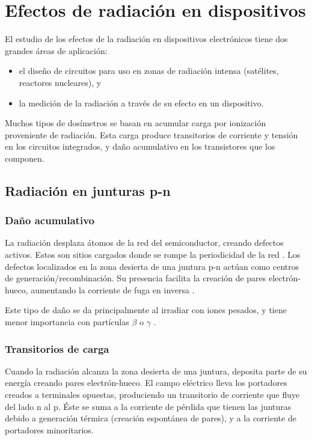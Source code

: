\section{Efectos de radiación en dispositivos}
El estudio de los efectos de la radiación en dispositivos electrónicos 
tiene dos grandes áreas de aplicación:
\begin{itemize}
    \item el diseño de circuitos para uso en zonas de radiación intensa
        (satélites, reactores nucleares), y
    \item la medición de la radiación a través de su efecto en un dispositivo.
\end{itemize}
Muchos tipos de dosímetros se basan en acumular 
carga por ionización proveniente de radiación.
Esta carga produce transitorios de corriente y tensión en los circuitos 
integrados, y daño acumulativo en los transistores que los componen.

\subsection{Radiación en junturas p-n}
\subsubsection{Daño acumulativo}
La radiación desplaza átomos de la red del semiconductor, 
creando defectos activos.
Estos son sitios cargados donde se rompe la periodicidad de la red
\cite{iniewski_radiation_2011}.
Los defectos localizados en la zona desierta de una juntura p-n
actúan como centros de generación/recombinación.
Su presencia facilita la creación de pares electrón-hueco, 
aumentando la corriente de fuga en inversa
.

Este tipo de daño se da principalmente al irradiar con iones pesados,
y tiene menor importancia con partículas $\beta$ o $\gamma$
\cite{knoll_radiation_2010}%
\cite{liu_electron_1971}.
\subsubsection{Transitorios de carga}
\label{latchup}
Cuando la radiación alcanza la zona desierta de una juntura,
deposita parte de su energía creando pares electrón-hueco.
El campo eléctrico lleva los portadores creados a terminales opuestas,
produciendo un transitorio de corriente que fluye del lado n al p.
Éste se suma a la corriente de pérdida que tienen las junturas
debido a generación térmica (creación espontánea de pares),
y a la corriente de portadores minoritarios.

